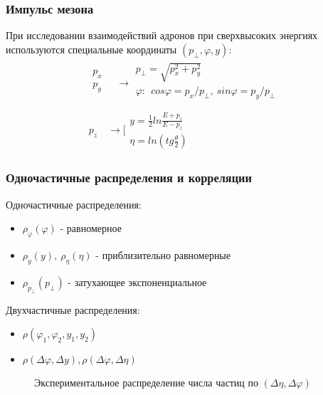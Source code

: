 \documentclass{beamer}
\renewcommand{\l}{\left( }
\renewcommand{\r}{\right) }
\renewcommand{\phi}{\varphi}
\newcommand{\br}[1]{\l {#1} \r}
\def\Dphi{\Delta\phi}
\def\Dy{\Delta y}
\def\Dn{\Delta \eta}
\begin{document}
\begin{frame}[fragile]
    \frametitle{Импульс мезона}
	При исследовании взаимодействий адронов при сверхвысоких энергиях используются специальные координаты $(p_\perp, \phi, y)$:
	\begin{gather*}
		\begin{matrix}
			p_x \\
			p_y \\
		\end{matrix}
		\quad \rightarrow
		\begin{matrix}
			p_\perp = \sqrt{p_x^2 + p_y^2} \\
			\phi:\ \ cos \phi = p_x / p_\perp,\ sin \phi = p_y / p_\perp \\
		\end{matrix} \\
		p_z
		\quad \rightarrow
		\bigg[
		\begin{matrix}
			y = \frac{1}{2} ln \frac{E + p_z}{E - p_z} \\
			\eta = ln \left( tg \frac{\theta}{2} \right)
		\end{matrix}
		\qquad\qquad\qquad\qquad\quad
	\end{gather*}
\end{frame}

\begin{frame}[fragile]
    \frametitle{Одночастичные распределения и корреляции}
	\begin{minipage}[h]{0.45\linewidth}
		Одночастичные распределения:
		\begin{itemize}
			\item $\rho_{\phi} (\phi)$ - равномерное \\
			\item $\rho_{y} (y),\ \rho_\eta (\eta)$ - приблизительно равномерные \\
			\item $\rho_{p_\perp} (p_\perp)$ - затухающее экспоненциальное \\
		\end{itemize}
		Двухчастичные распределения:
		\begin{itemize}
			\item $\rho (\phi_1, \phi_2, y_1, y_2)$ \\
			\item $\rho (\Dphi, \Dy), \rho (\Dphi, \Dn)$
		\end{itemize}
	\end{minipage}
	\begin{minipage}[h]{0.53\linewidth}
		\begin{figure}
			\caption{Экспериментальное распределение числа частиц по $\br{\Delta \eta, \Delta \phi}$  }
		\end{figure}
	\end{minipage}
\end{frame}
\end{document}
